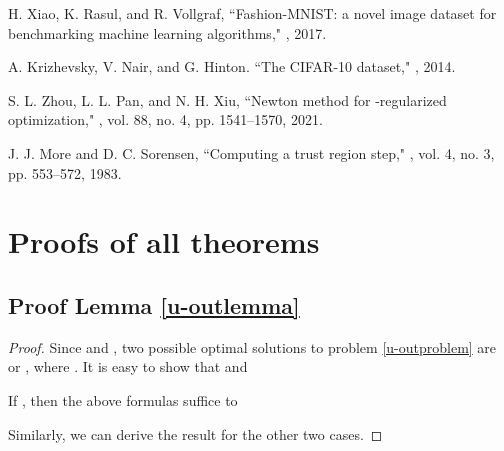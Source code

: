 \documentclass[journal]{IEEEtran}
\begin{document}
\begin{thebibliography}{99}
H. Xiao, K. Rasul, and R. Vollgraf,
\newblock  ``Fashion-MNIST: a novel image dataset for benchmarking machine learning algorithms,"
, 2017.

 A. Krizhevsky, V. Nair, and G. Hinton.
\newblock  ``The CIFAR-10 dataset,"
, 2014.

S. L. Zhou, L. L. Pan, and N. H. Xiu,
\newblock  ``Newton method for -regularized optimization,"
,
\newblock vol. 88, no. 4, pp. 1541--1570, 2021.


J. J. More and D. C. Sorensen,
\newblock  ``Computing a trust region step,"
, vol. 4, no. 3, pp. 553--572, 1983.

\end{thebibliography}

\newpage
\onecolumn
\appendices
 \section{Proofs of all theorems}
\subsection{Proof Lemma \ref{u-outlemma}}
\begin{proof}
Since   and   , two possible optimal solutions to problem \eqref{u-outproblem} are  or , where . It is easy to show that  and

If , then the above formulas suffice to

Similarly, we can derive the result for the other two cases.
\end{proof}
\end{document}
